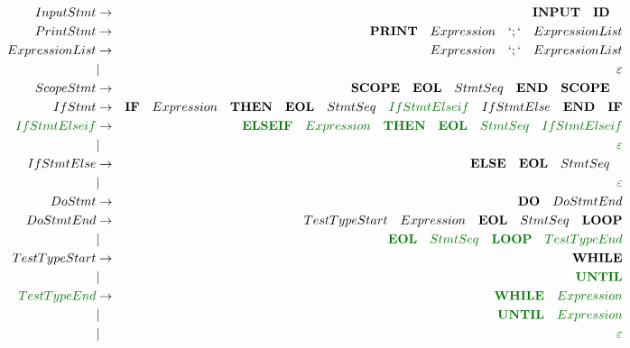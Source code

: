\documentclass[a4paper,11pt,leqno]{article}
\begin{document}
\begin{landscape}
\begin{eqnarray}
InputStmt	&	 \rightarrow	& \textbf{INPUT}\quad \textbf{ID}\quad	 \\
PrintStmt	&	 \rightarrow	& \textbf{PRINT}\quad Expression\quad `;` \quad ExpressionList\\
ExpressionList&  \rightarrow	&  Expression\quad `;`\quad ExpressionList\\
			&	 |				& \varepsilon	\\
ScopeStmt	&	 \rightarrow	&	\textbf{SCOPE}\quad   \textbf{EOL} \quad StmtSeq\quad	 \textbf{END}\quad \textbf{SCOPE}\quad	  \\
IfStmt	&\rightarrow& \textbf{IF} \quad Expression \quad \textbf{THEN}\quad \textbf{EOL}\quad StmtSeq \quad \textcolor{green1}{IfStmtElseif}\quad IfStmtElse\quad \textbf{END}\quad \textbf{IF}	\\
\textcolor{green1}{IfStmtElseif}&\rightarrow &\textcolor{green1}{\textbf{ELSEIF}\quad Expression\quad \textbf{THEN}\quad \textbf{EOL}\quad StmtSeq \quad IfStmtElseif}	 \\
&	|	&\textcolor{green1}{\varepsilon}  \\
IfStmtElse&   \rightarrow &\textbf{ELSE}\quad  \textbf{EOL}\quad StmtSeq\quad  \\
&	|	&\textcolor{green1}{\varepsilon}  \\
DoStmt&    \rightarrow	  & \textbf{DO} \quad DoStmtEnd   \\
DoStmtEnd&	 \rightarrow  &  TestTypeStart \quad  Expression \quad \textbf{EOL} \quad StmtSeq \quad \textbf{LOOP}	\\
&	 | &\textcolor{green1}{\textbf{EOL} \quad StmtSeq \quad \textbf{LOOP}\quad TestTypeEnd} \\
TestTypeStart & \rightarrow	&	\textbf{WHILE}\\
		&		|		& \textcolor{green1}{\textbf{UNTIL}} \\
\textcolor{green1}{TestTypeEnd} & \rightarrow	&	\textcolor{green1}{\textbf{WHILE}\quad Expression} \\
&		|		& \textcolor{green1}{\textbf{UNTIL}\quad Expression} \\
&	|	&\textcolor{green1}{\varepsilon}  \\

\end{eqnarray}
\end{landscape}
\end{document}
